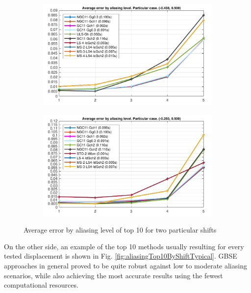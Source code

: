 \begin{figure}[htpb]
\begin{subfigure}{0.5\textwidth}
\includegraphics[width=\textwidth]{img/tableAliasingTop10ByShift4}
\end{subfigure}%
\begin{subfigure}{0.5\textwidth}
\includegraphics[width=\textwidth]{img/tableAliasingTop10ByShift8}
\end{subfigure}%
\caption{Average error by aliasing level of top 10 for two particular shifts}
\label{fig:aliasingTop10ByShiftParticular}
\end{figure}
On the other side, an example of the top 10 methods usually resulting for every tested displacement is shown in Fig. \ref{fig:aliasingTop10ByShiftTypical}. GBSE approaches in general proved to be quite robust against low to moderate aliasing scenarios, while also achieving the most accurate results using the fewest computational resources. 

